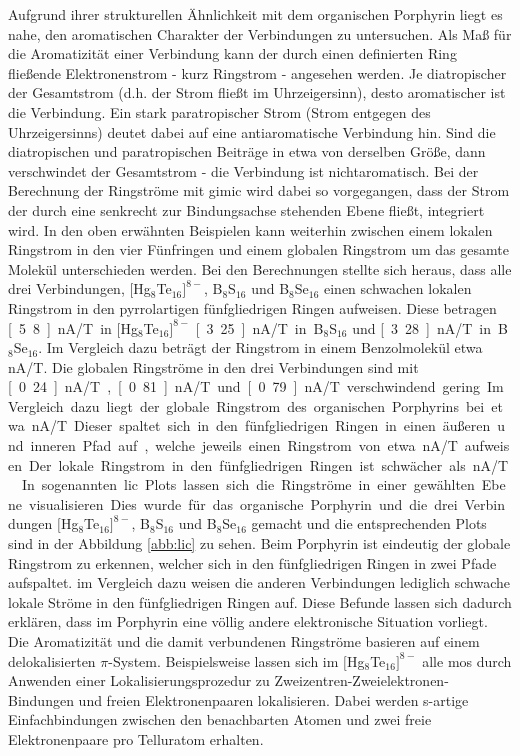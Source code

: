 Aufgrund ihrer strukturellen Ähnlichkeit mit dem organischen Porphyrin liegt es nahe, den aromatischen Charakter der Verbindungen zu untersuchen. Als Maß für die Aromatizität einer Verbindung kann der durch einen definierten Ring fließende Elektronenstrom - kurz Ringstrom - angesehen werden. Je diatropischer der Gesamtstrom (d.h. der Strom fließt im Uhrzeigersinn), desto aromatischer ist die Verbindung. Ein stark paratropischer Strom (Strom entgegen des Uhrzeigersinns) deutet dabei auf eine antiaromatische Verbindung hin. Sind die diatropischen und paratropischen Beiträge in etwa von derselben Größe, dann verschwindet der Gesamtstrom - die Verbindung ist nichtaromatisch. Bei der Berechnung der Ringströme mit \ac{gimic} wird dabei so vorgegangen, dass der Strom der durch eine senkrecht zur Bindungsachse stehenden Ebene fließt, integriert wird. In den oben erwähnten Beispielen kann weiterhin zwischen einem lokalen Ringstrom in den vier Fünfringen und einem globalen Ringstrom um das gesamte Molekül unterschieden werden. Bei den Berechnungen stellte sich heraus, dass alle drei Verbindungen, $[$Hg$_8$Te$_{16}]^{8-}$, B$_8$S$_{16}$ und B$_8$Se$_{16}$ einen schwachen lokalen Ringstrom in den pyrrolartigen fünfgliedrigen Ringen aufweisen. Diese betragen \unit[5.8]{nA/T} in $[$Hg$_8$Te$_{16}]^{8-}$ \unit[3.25]{nA/T} in B$_8$S$_{16}$ und \unit[3.28]{nA/T} in B$_8$Se$_{16}$. Im Vergleich dazu beträgt der Ringstrom in einem Benzolmolekül etwa \unit[12]{nA/T}\supercite{fliegl2012aromatic}. Die globalen Ringströme in den drei Verbindungen sind mit \unit[0.24]{nA/T}, \unit[0.81]{nA/T} und \unit[0.79]{nA/T} verschwindend gering. Im Vergleich dazu liegt der globale Ringstrom des organischen Porphyrins bei etwa \unit[27]{nA/T}. Dieser spaltet sich in den fünfgliedrigen Ringen in einen äußeren und inneren Pfad auf, welche jeweils einen Ringstrom von etwa \unit[13]{nA/T} aufweisen. Der lokale Ringstrom in den fünfgliedrigen Ringen ist schwächer als \unit[1]{nA/T}.\supercite{fliegl2012aromatic} In sogenannten \ac{lic} Plots lassen sich die Ringströme in einer gewählten Ebene visualisieren. Dies wurde für das organische Porphyrin und die drei Verbindungen $[$Hg$_8$Te$_{16}]^{8-}$, B$_8$S$_{16}$ und B$_8$Se$_{16}$ gemacht und die entsprechenden Plots sind in der Abbildung \ref{abb:lic} zu sehen. Beim Porphyrin ist eindeutig der globale Ringstrom zu erkennen, welcher sich in den fünfgliedrigen Ringen in zwei Pfade aufspaltet. im Vergleich dazu weisen die anderen Verbindungen lediglich schwache lokale Ströme in den fünfgliedrigen Ringen auf.
Diese Befunde lassen sich dadurch erklären, dass im Porphyrin eine völlig andere elektronische Situation vorliegt. Die Aromatizität und die damit verbundenen Ringströme basieren auf einem delokalisierten $\pi$-System. Beispielsweise lassen sich im $[$Hg$_8$Te$_{16}]^{8-}$ alle \acp{mo} durch Anwenden einer Lokalisierungsprozedur\supercite{boys1960sf} zu Zweizentren-Zweielektronen-Bindungen und freien Elektronenpaaren lokalisieren. Dabei werden s-artige Einfachbindungen zwischen den benachbarten Atomen und zwei freie Elektronenpaare pro Telluratom erhalten. 

